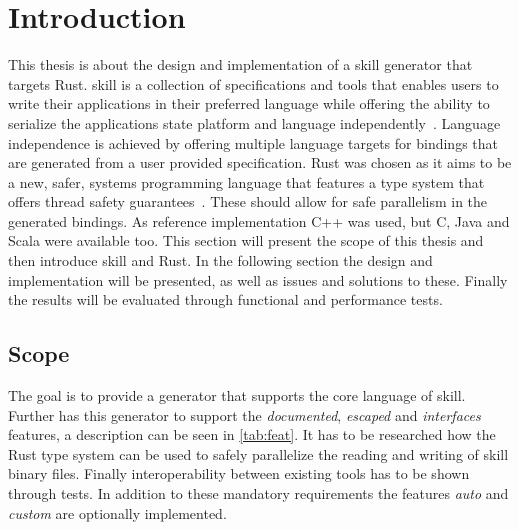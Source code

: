 \documentclass[thesis]{subfiles}
\begin{document}
\chapter{Introduction}\label{sec:intro}
This thesis is about the design and implementation of a \gls{skill} generator that targets Rust.
\gls{skill} is a collection of specifications and tools that enables users to write their applications in their preferred language while offering the ability to serialize the applications state platform and language independently~\autocite{skill-tr}.
Language independence is achieved by offering multiple language targets for bindings that are generated from a user provided specification.
Rust was chosen as it aims to be a new, safer, systems programming language that features a type system that offers thread safety guarantees~\autocite{rust-org}.
These should allow for safe parallelism in the generated bindings.
As reference implementation C++ was used, but C, Java and Scala were available too.
This section will present the scope of this thesis and then introduce \gls{skill} and Rust.
In the following section the design and implementation will be presented, as well as issues and solutions to these.
Finally the results will be evaluated through functional and performance tests.

\section{Scope}
  The goal is to provide a generator that supports the core language of \gls{skill}\autocite{skill-tr}.
  Further has this generator to support the \emph{documented}, \emph{escaped} and \emph{interfaces} features, a description can be seen in \autoref{tab:feat}.
  It has to be researched how the Rust type system can be used to safely parallelize the reading and writing of \gls{skill} binary files.
  Finally interoperability between existing tools has to be shown through tests.
  In addition to these mandatory requirements the features \emph{auto} and \emph{custom} are optionally implemented.
\end{document}
